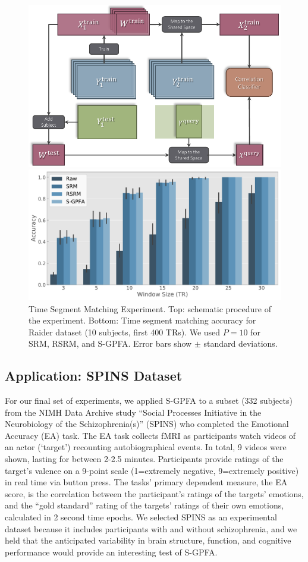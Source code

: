 \begin{figure}[tb!]
    \centering
    \includegraphics[width=.7\linewidth]{figs/ch1/tsm_blockdiagram.pdf}
    
    \vspace{3em}

    \includegraphics[width=1\linewidth]{figs/ch1/tsm_raider_p10_sm200.pdf}
    \caption{Time Segment Matching Experiment. Top: schematic procedure of the experiment. Bottom: Time segment matching accuracy for Raider dataset (10 subjects, first 400 TRs). We used $P= 10$ for SRM, RSRM, and S-GPFA. Error bars show $\pm$ standard deviations.}
    \label{ch1:fig:tsm}
\end{figure}

\subsection{Application: SPINS Dataset}

For our final set of experiments, we applied S-GPFA to a subset (332 subjects) from the NIMH Data Archive study “Social Processes Initiative in the Neurobiology of the Schizophrenia(s)” (SPINS) who completed the Emotional Accuracy (EA) task. The EA task collects fMRI as participants watch videos of an actor (‘target’) recounting autobiographical events. In total, 9 videos were shown, lasting for between 2-2.5 minutes. Participants provide ratings of the target’s valence on a 9-point scale (1=extremely negative, 9=extremely positive) in real time via button press. The tasks' primary dependent measure, the EA score, is the correlation between the participant’s ratings of the targets’ emotions, and the “gold standard” rating of the targets’ ratings of their own emotions, calculated in 2 second time epochs. We selected SPINS as an experimental dataset because it includes participants with and without schizophrenia, and we held that the anticipated variability in brain structure, function, and cognitive performance would provide an interesting test of S-GPFA.

